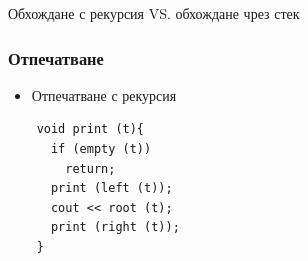 \documentclass{beamer}
\begin{document}
\begin{frame}
\centerline{Обхождане с рекурсия VS. обхождане чрез стек}
\end{frame}


\begin{frame}[fragile]
\frametitle{Отпечатване}

\begin{itemize}
  \item Отпечатване с рекурсия 
\end{itemize}

\begin{flushleft}
  \begin{lstlisting}
    void print (t){
      if (empty (t))
        return;
      print (left (t));
      cout << root (t);
      print (right (t));
    }
  \end{lstlisting}
\end{flushleft}

\end{frame}
\end{document}
